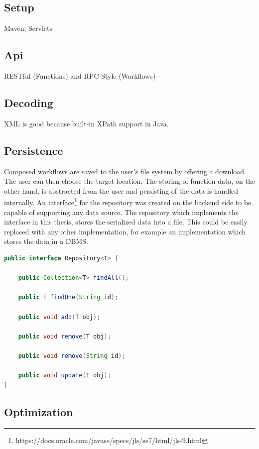 \documentclass[a4paper,12pt,pdftex,halfparskip,cleardoubleempty,bibtotoc,liststotoc]{scrbook}
\begin{document}
\subsection{Setup}
 Maven, Servlets

\subsection{Api}

RESTful (Functions) and RPC-Style (Workflows)

\subsection{Decoding}
\label{sec:backend-decoding}
 XML is good because built-in XPath support in Java.

\subsection{Persistence}
\label{sec:backend-persistence}

Composed workflows are saved to the user's file system by offering a download. The user can then choose the target location.
The storing of function data, on the other hand, is abstracted from the user and persisting of the data is handled internally.
An interface\footnote{https://docs.oracle.com/javase/specs/jls/se7/html/jls-9.html} for the repository was created on the backend side to be capable of supporting any data source. The repository which implements the interface in this thesis, stores the serialized data into a file. This could be easily replaced with any other implementation, for example an implementation which stores the data in a DBMS.

\begin{lstlisting}[language=Java, caption=Repository Interface]
public interface Repository<T> {

    public Collection<T> findAll();

    public T findOne(String id);

    public void add(T obj);

    public void remove(T obj);

    public void remove(String id);

    public void update(T obj);
}
\end{lstlisting}

\subsection{Optimization}
\end{document}
